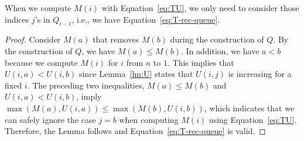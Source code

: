 \begin{lemma} \label{lm:Q}
When we compute $M(i)$ with Equation~\ref{eq:TU}, we only need to consider those indices $j$'s in $Q_{i-1}$, i.e., we have Equation~\ref{eq:T-rec-queue}.
\end{lemma}
\begin{proof}
Consider $M(a)$ that removes $M(b)$ during the construction of $Q$.
By the construction of $Q$, we have $M(a) \leq M(b)$.
In addition, we have $a < b$ because we compute $M(i)$ for $i$ from $n$ to $1$.
This implies that $U(i, a) < U(i, b)$ since Lemma~\ref{lm:U} states that $U(i, j)$ is increasing for a fixed $i$.
The preceding two inequalities, $M(a) \leq M(b)$ and $U(i, a) < U(i, b)$, imply $\max(M(a), U(i, a)) \leq \max(M(b), U(i, b))$, which indicates that we can safely ignore the case $j=b$ when computing $M(i)$ using Equation~\ref{eq:TU}.
Therefore, the Lemma follows and Equation~\ref{eq:T-rec-queue} is valid.
\end{proof}

